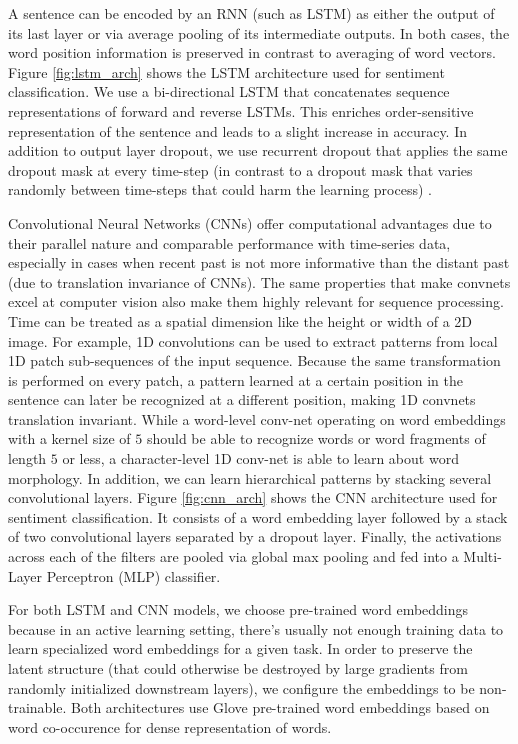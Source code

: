 A sentence can be encoded by an RNN (such as LSTM) as either the output of its last layer or via average pooling of its intermediate outputs. In both cases, the word position information is preserved in contrast to averaging of word vectors. Figure \ref{fig:lstm_arch} shows the LSTM architecture used for sentiment classification. We use a bi-directional LSTM that concatenates sequence representations of forward and reverse LSTMs. This enriches order-sensitive representation of the sentence and leads to a slight increase in accuracy. In addition to output layer dropout, we use recurrent dropout that applies the same dropout mask at every time-step (in contrast to a dropout mask that varies randomly between time-steps that could harm the learning process) \cite{Gal2016}.   

Convolutional Neural Networks (CNNs) offer computational advantages due to their parallel nature and comparable performance with time-series data, especially in cases when recent past is not more informative than the distant past (due to translation invariance of CNNs). The same properties that make convnets excel at computer vision also make them highly relevant for sequence processing. Time can be treated as a spatial dimension like the height or width of a 2D image. For example, 1D convolutions can be used to extract patterns from local 1D patch sub-sequences of the input sequence. Because the same transformation is performed on every patch, a pattern learned at a certain position in the sentence can later be recognized at a different position, making 1D convnets translation invariant. While a word-level conv-net operating on word embeddings with a kernel size of $5$ should be able to recognize words or word fragments of length $5$ or less, a character-level 1D conv-net is able to learn about word morphology. In addition, we can learn hierarchical patterns by stacking several convolutional layers. Figure \ref{fig:cnn_arch} shows the CNN architecture used for sentiment classification. It consists of a word embedding layer followed by a stack of two convolutional layers separated by a dropout layer. Finally, the activations across each of the filters are pooled via global max pooling and fed into a Multi-Layer Perceptron (MLP) classifier.  

For both LSTM and CNN models, we choose pre-trained word embeddings because in an active learning setting, there's usually not enough training data to learn specialized word embeddings for a given task. In order to preserve the latent structure (that could otherwise be destroyed by large gradients from randomly initialized downstream layers), we configure the embeddings to be non-trainable. Both architectures use Glove pre-trained word embeddings \cite{Glove2014} based on word co-occurence for dense representation of words. 

